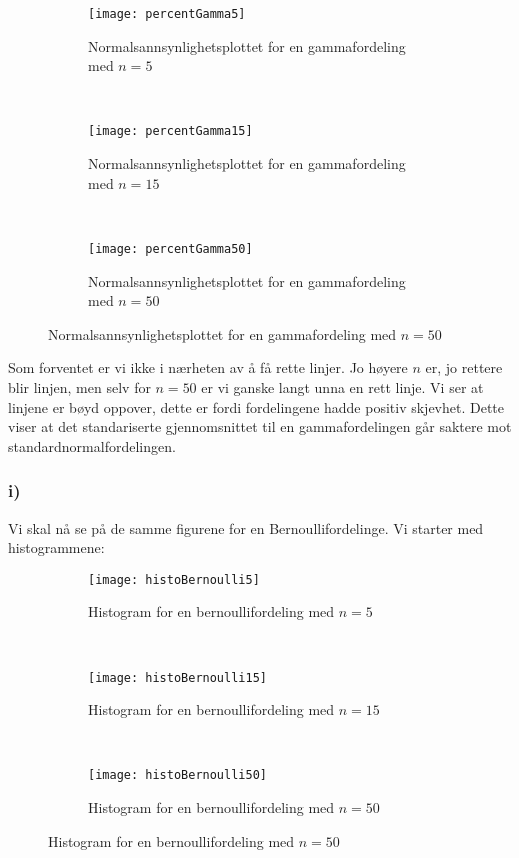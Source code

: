 \documentclass[a4paper,norsk, 10pt]{article}
\begin{document}
\begin{figure}[H]
\centering
	\begin{subfigure}[b]{0.4\textwidth}
        \texttt{[image: percentGamma5]}
        \caption{Normalsannsynlighetsplottet for en gammafordeling med $n = 5$}
        \label{fig:PG15}
    \end{subfigure}
    ~
    \begin{subfigure}[b]{0.4\textwidth}
        \texttt{[image: percentGamma15]}
        \caption{Normalsannsynlighetsplottet for en gammafordeling med $n = 15$}
        \label{fig:PG50}
    \end{subfigure}
     ~
    \begin{subfigure}[b]{0.4\textwidth}
        \texttt{[image: percentGamma50]}
        \caption{Normalsannsynlighetsplottet for en gammafordeling med $n = 50$}
        \label{fig:PG50}
    \end{subfigure}
\end{figure} 

Som forventet er vi ikke i nærheten av å få rette linjer. Jo høyere $n$ er, jo rettere blir linjen, men selv for $n = 50$ er vi ganske langt unna en rett linje. Vi ser at linjene er bøyd oppover, dette er fordi fordelingene hadde positiv skjevhet. Dette viser at det standariserte gjennomsnittet til en gammafordelingen går saktere mot standardnormalfordelingen.

\subsubsection*{i)}

Vi skal nå se på de samme figurene for en Bernoullifordelinge. Vi starter med histogrammene:

\begin{figure}[H]
\centering
	\begin{subfigure}[b]{0.4\textwidth}
        \texttt{[image: histoBernoulli5]}
        \caption{Histogram for en bernoullifordeling med $n = 5$}
        \label{fig:HB15}
    \end{subfigure}
    ~
    \begin{subfigure}[b]{0.3\textwidth}
        \texttt{[image: histoBernoulli15]}
        \caption{Histogram for en bernoullifordeling med $n = 15$}
        \label{fig:HB50}
    \end{subfigure}
     ~
    \begin{subfigure}[b]{0.3\textwidth}
        \texttt{[image: histoBernoulli50]}
        \caption{Histogram for en bernoullifordeling med $n = 50$}
        \label{fig:HB50}
    \end{subfigure}
\end{figure}
\end{document}
